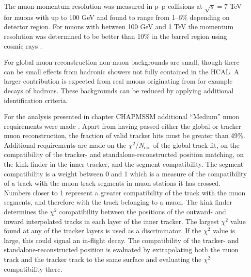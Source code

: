 The muon momentum resolution was measured in p--p collisions at $\sqrt{s}=7$ TeV
for muons with \pT up to 100 GeV and found to range from 1--6\% depending
on detector region. For muons with \pT between 100 GeV and 1 TeV the momentum resolution
was determined to be better than 10\% in the barrel region using cosmic rays \cite{cms-muon-reco}.

For global muon reconstruction non-muon backgrounds are small,
though there can be small effects from hadronic showers not fully
contained in the \ac{HCAL}. A larger contribution is expected
from real muons originating from for example decays of hadrons. These
backgrounds can be reduced by applying additional identification criteria.

For the analysis presented in chapter CHAPMSSM additional ``Medium'' muon requirements were made \cite{CMS-PAS-HIG-16-037}.
Apart from having passed either the global or tracker muon reconstruction, the fraction
of valid tracker hits must be greater than 49\%. Additional requirements are made on the
$\chi^2$/$N_{\text{dof}}$ of the global track fit, on the compatibility of the tracker- and standalone-reconstructed
position matching, on the kink finder in the inner tracker, and the segment compatibility. The segment
compatibility is a weight between 0 and 1 which is a measure of the compatibility of a track with
the muon track segments in muon stations it has crossed. Numbers closer to 1 represent
a greater compatibility of the track with the muon segments, and therefore with the track belonging to a muon.
The kink finder determines the $\chi^2$ compatibility between the positions of the outward- and inward interpolated
tracks in each layer of the inner tracker. The largest $\chi^2$ value found at any of the tracker layers 
is used as a discriminator. If the $\chi^2$ value is large, this could signal an in-flight decay.
The compatibility of the tracker- and standalone-reconstructed position is evaluated
by extrapolating both the muon track and the tracker track to the same surface and evaluating the $\chi^2$ 
compatibility there.

